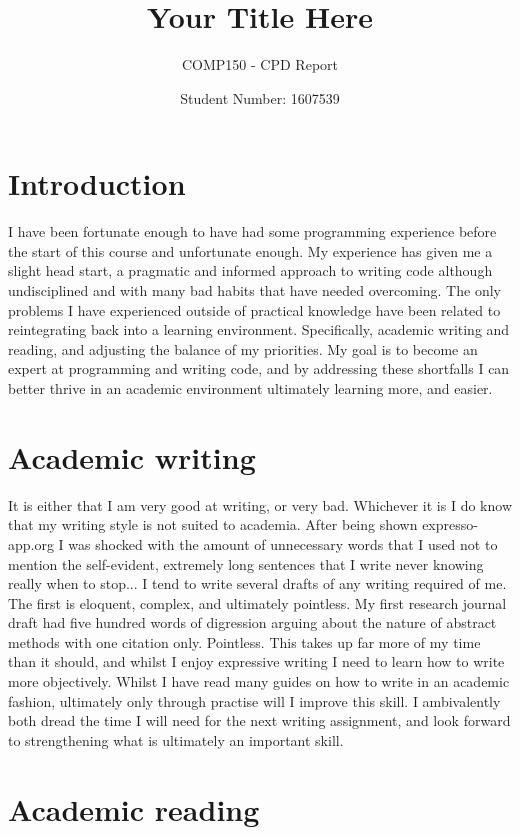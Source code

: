 \documentclass{scrartcl}
\title{Your Title Here}
\subtitle{COMP150 - CPD Report}
\author{Student Number: 1607539}
\begin{document}
\maketitle

\section{Introduction}

I have been fortunate enough to have had some programming experience before the start of this course and unfortunate enough. My experience has given me a slight head start, a pragmatic and informed approach to writing code although undisciplined and with many bad habits that have needed overcoming. The only problems I have experienced outside of practical knowledge have been related to reintegrating back into a learning environment. Specifically, academic writing and reading, and adjusting the balance of my priorities. My goal is to become an expert at programming and writing code, and by addressing these shortfalls I can better thrive in an academic environment ultimately learning more, and easier.

\section{Academic writing}

It is either that I am very good at writing, or very bad. Whichever it is I do know that my writing style is not suited to academia. After being shown expresso-app.org I was shocked with the amount of unnecessary words that I used not to mention the self-evident, extremely long sentences that I write never knowing really when to stop... I tend to write several drafts of any writing required of me. The first is eloquent, complex, and ultimately pointless. My first research journal draft had five hundred words of digression arguing about the nature of abstract methods with one citation only. Pointless. This takes up far more of my time than it should, and whilst I enjoy expressive writing I need to learn how to write more objectively. Whilst I have read many guides on how to write in an academic fashion, ultimately only through practise will I improve this skill. I ambivalently both dread the time I will need for the next writing assignment, and look forward to strengthening what is ultimately an important skill.

\section{Academic reading}
\end{document}
